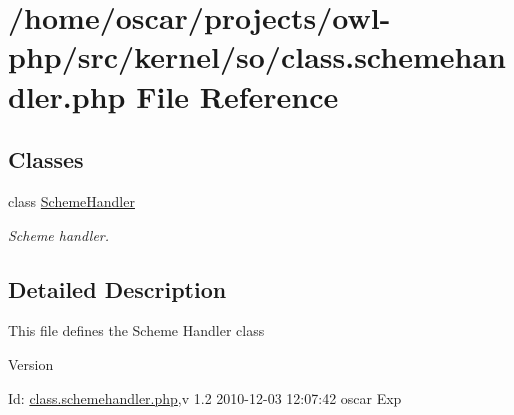 \section{/home/oscar/projects/owl-\/php/src/kernel/so/class.schemehandler.php File Reference}
\label{class_8schemehandler_8php}
\subsection*{Classes}
\begin{DoxyCompactItemize}
\item 
class \hyperlink{classSchemeHandler}{SchemeHandler}
\begin{DoxyCompactList}\small\item\em Scheme handler. \item\end{DoxyCompactList}\end{DoxyCompactItemize}


\subsection{Detailed Description}
This file defines the Scheme Handler class \begin{DoxyVersion}{Version}

\end{DoxyVersion}
\begin{DoxyParagraph}{Id:}
\hyperlink{class_8schemehandler_8php}{class.schemehandler.php},v 1.2 2010-\/12-\/03 12:07:42 oscar Exp 
\end{DoxyParagraph}
